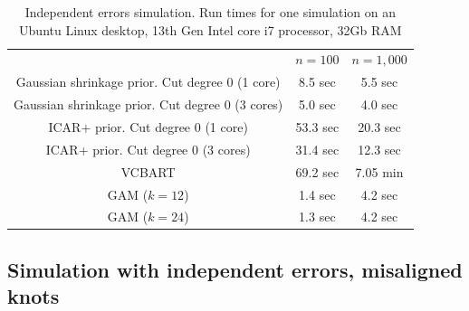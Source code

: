\begin{table}
\begin{center}
\begin{tabular}{ccc} %
                                                 & $n=100$  & $n=1,000$ \\ %
Gaussian shrinkage prior. Cut degree 0 (1 core)  &   8.5 sec &  5.5 sec  \\ 
Gaussian shrinkage prior. Cut degree 0 (3 cores) &   5.0 sec &  4.0 sec  \\ 
ICAR+ prior. Cut degree 0 (1 core)               &   53.3 sec &  20.3 sec  \\ 
ICAR+ prior. Cut degree 0 (3 cores)              &   31.4 sec &  12.3 sec  \\ 
VCBART          &  69.2 sec  & 7.05 min \\
GAM ($k=12$)             &  1.4 sec  & 4.2 sec\\
GAM ($k=24$)             &  1.3 sec  & 4.2 sec\\
\end{tabular}
\end{center}
\caption{Independent errors simulation. Run times for one simulation on an Ubuntu Linux desktop, 13th Gen Intel core i7 processor, 32Gb RAM}
\label{tab:cputime_simiid}
\end{table}




\subsection{Simulation with independent errors, misaligned knots}
\label{ssec:simulation_iid_misalign}

